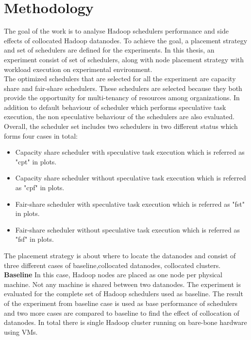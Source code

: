 \section{Methodology}

The goal of the work is to analyse Hadoop schedulers performance and side effects of collocated Hadoop datanodes. To achieve the goal, a placement strategy and set of schedulers  are defined for the experiments. In this thesis, an experiment consist of set of schedulers, along with node placement strategy with workload execution on experimental environment. \\

The optimized schedulers that are selected for all the experiment are capacity share and fair-share schedulers. These schedulers are selected because they both provide the opportunity for multi-tenancy of resources among organizations. In addition to default behaviour of scheduler which performs speculative task execution, the non speculative behaviour of the schedulers are also evaluated. Overall, the scheduler set includes two schedulers in two different status which forms four cases in total:\\
 \begin{itemize}
 \item{Capacity share scheduler with speculative task execution which is referred as "cpt" in plots.}
 \item{Capacity share scheduler without speculative task execution which is referred as "cpf" in plots.}
 \item{Fair-share scheduler with speculative task execution which is referred as "fst" in plots.}
 \item{Fair-share scheduler without speculative task execution which is referred as "fsf" in plots.}
 \end{itemize}
	
The placement strategy is about where to locate the datanodes and consist of three different cases of baseline,collocated datanodes, collocated clusters.\\

\textbf{Baseline } In this case, Hadoop nodes are placed as one node per physical machine. Not any machine is shared between two datanodes. The experiment is evaluated for the complete set of Hadoop schedulers used as baseline. The result of the experiment from baseline case is used as base performance of schedulers and two more cases are compared to baseline to find the effect of collocation of datanodes.  In total there is single Hadoop cluster running on bare-bone hardware using VMs.\\ 
 
